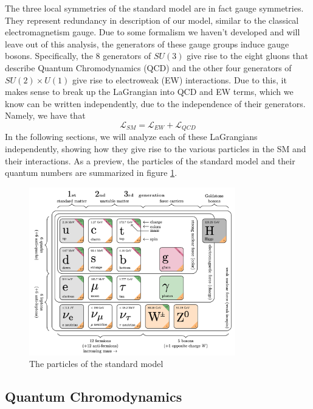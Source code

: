 The three local symmetries of the standard model are in fact gauge symmetries. They represent redundancy in description of our model, similar to the classical electromagnetism gauge. Due to some formalism we haven't developed and will leave out of this analysis, the generators of these gauge groups induce gauge bosons. Specifically, the 8 generators of $SU(3)$ give rise to the eight gluons that describe Quantum Chromodynamics (QCD) and the other four generators of $SU(2) \times U(1)$ give rise to electroweak (EW) interactions. Due to this, it makes sense to break up the LaGrangian into QCD and EW terms, which we know can be written independently, due to the independence of their generators. Namely, we have that
\begin{equation}
\mathcal{L}_{SM} = \mathcal{L}_{EW} + \mathcal{L}_{QCD}
\end{equation}
In the following sections, we will analyze each of these LaGrangians independently, showing how they give rise to the various particles in the SM and their interactions. As a preview, the particles of the standard model and their quantum numbers are summarized in figure \ref{fig:particles_of_the_SM}. 

\begin{figure}[ht!]
    \centering
    \includegraphics[width=0.8\textwidth]{figures/chapter2/particles_of_the_SM.png}
    \caption{The particles of the standard model}
    \label{fig:particles_of_the_SM}
\end{figure}

\subsection{Quantum Chromodynamics}

